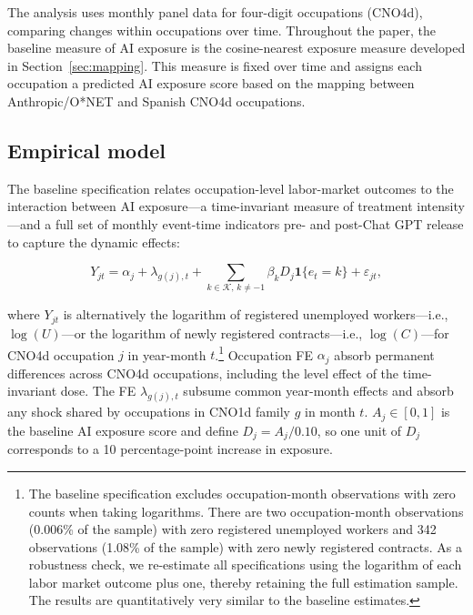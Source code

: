 \documentclass[11pt]{article}
\begin{document}
The analysis uses monthly panel data for four-digit occupations (CNO4d), comparing changes within occupations over time. Throughout the paper, the baseline measure of AI exposure is the cosine-nearest exposure measure developed in Section~\ref{sec:mapping}. This measure is fixed over time and assigns each occupation a predicted AI exposure score based on the mapping between Anthropic/O*NET and Spanish CNO4d occupations.

\subsection{Empirical model}
\label{sec:empirical_model}

The baseline specification relates occupation-level labor-market outcomes to the interaction between AI exposure---a time-invariant measure of treatment intensity---and a full set of monthly event-time indicators pre- and post-Chat GPT release to capture the dynamic effects:

\begin{equation}
Y_{jt}=\alpha_j+\lambda_{g(j),t}+\sum_{k\in\mathcal{K},\,k\neq-1}\beta_k D_j\mathbf{1}\{e_t=k\}+\varepsilon_{jt},
\label{eq:baseline_dynamic}
\end{equation}

where $Y_{jt}$ is alternatively the logarithm of registered unemployed workers---i.e., $\log(U)$---or the logarithm of newly registered contracts---i.e., $\log(C)$---for CNO4d occupation $j$ in year-month $t$.\footnote{The baseline specification excludes occupation-month observations with zero counts when taking logarithms. There are two occupation-month observations (0.006\% of the sample) with zero registered unemployed workers and 342 observations (1.08\% of the sample) with zero newly registered contracts. As a robustness check, we re-estimate all specifications using the logarithm of each labor market outcome plus one, thereby retaining the full estimation sample. The results are quantitatively very similar to the baseline estimates.} Occupation FE \(\alpha_j\) absorb permanent differences across CNO4d occupations, including the level effect of the time-invariant dose. The FE \(\lambda_{g(j),t}\) subsume common year-month effects and absorb any shock shared by occupations in CNO1d family \(g\) in month \(t\). \(A_j\in[0,1]\) is the baseline AI exposure score and define \(D_j=A_j/0.10\), so one unit of \(D_j\) corresponds to a 10 percentage-point increase in exposure. 
\end{document}
